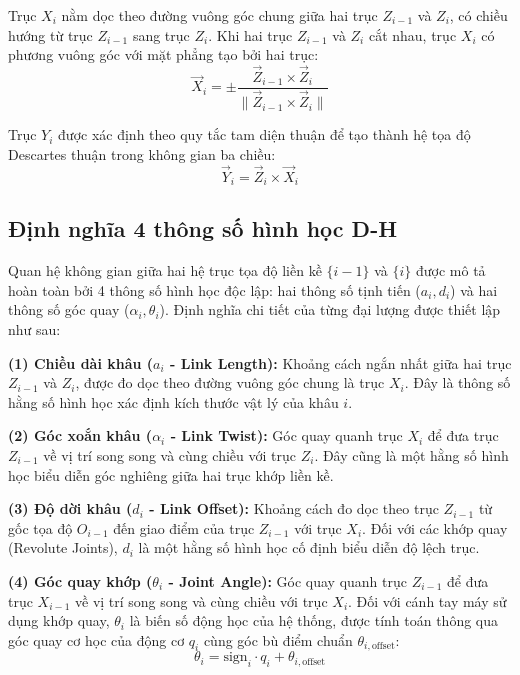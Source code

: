 Trục $X_i$ nằm dọc theo đường vuông góc chung giữa hai trục $Z_{i-1}$ và $Z_i$, có chiều hướng từ trục $Z_{i-1}$ sang trục $Z_i$. Khi hai trục $Z_{i-1}$ và $Z_i$ cắt nhau, trục $X_i$ có phương vuông góc với mặt phẳng tạo bởi hai trục:
\begin{equation}
    \vec{X}_i = \pm \frac{\vec{Z}_{i-1} \times \vec{Z}_i}{\|\vec{Z}_{i-1} \times \vec{Z}_i\|}
\end{equation}

Trục $Y_i$ được xác định theo quy tắc tam diện thuận để tạo thành hệ tọa độ Descartes thuận trong không gian ba chiều:
\begin{equation}
    \vec{Y}_i = \vec{Z}_i \times \vec{X}_i
\end{equation}

\subsection{Định nghĩa 4 thông số hình học D-H}

Quan hệ không gian giữa hai hệ trục tọa độ liền kề $\{i-1\}$ và $\{i\}$ được mô tả hoàn toàn bởi 4 thông số hình học độc lập: hai thông số tịnh tiến ($a_i, d_i$) và hai thông số góc quay ($\alpha_i, \theta_i$). Định nghĩa chi tiết của từng đại lượng được thiết lập như sau:

\textbf{(1) Chiều dài khâu ($a_i$ - Link Length):} Khoảng cách ngắn nhất giữa hai trục $Z_{i-1}$ và $Z_i$, được đo dọc theo đường vuông góc chung là trục $X_i$. Đây là thông số hằng số hình học xác định kích thước vật lý của khâu $i$.

\textbf{(2) Góc xoắn khâu ($\alpha_i$ - Link Twist):} Góc quay quanh trục $X_i$ để đưa trục $Z_{i-1}$ về vị trí song song và cùng chiều với trục $Z_i$. Đây cũng là một hằng số hình học biểu diễn góc nghiêng giữa hai trục khớp liền kề.

\textbf{(3) Độ dời khâu ($d_i$ - Link Offset):} Khoảng cách đo dọc theo trục $Z_{i-1}$ từ gốc tọa độ $O_{i-1}$ đến giao điểm của trục $Z_{i-1}$ với trục $X_i$. Đối với các khớp quay (Revolute Joints), $d_i$ là một hằng số hình học cố định biểu diễn độ lệch trục.

\textbf{(4) Góc quay khớp ($\theta_i$ - Joint Angle):} Góc quay quanh trục $Z_{i-1}$ để đưa trục $X_{i-1}$ về vị trí song song và cùng chiều với trục $X_i$. Đối với cánh tay máy sử dụng khớp quay, $\theta_i$ là biến số động học của hệ thống, được tính toán thông qua góc quay cơ học của động cơ $q_i$ cùng góc bù điểm chuẩn $\theta_{i,\text{offset}}$:
\begin{equation}
    \theta_i = \text{sign}_i \cdot q_i + \theta_{i,\text{offset}}
\end{equation}

